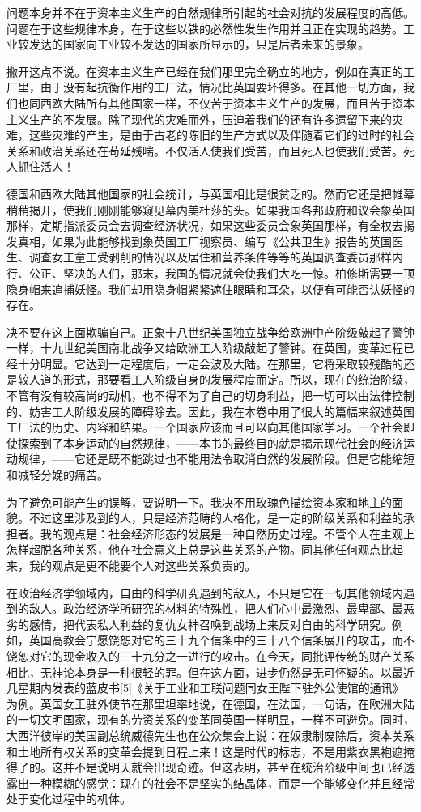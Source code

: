 \documentclass{ctexbook}
\begin{document}
问题本身并不在于资本主义生产的自然规律所引起的社会对抗的发展程度的高低。问题在于这些规律本身，在于这些以铁的必然性发生作用并且正在实现的趋势。工业较发达的国家向工业较不发达的国家所显示的，只是后者未来的景象。

撇开这点不说。在资本主义生产已经在我们那里完全确立的地方，例如在真正的工厂里，由于没有起抗衡作用的工厂法，情况比英国要坏得多。在其他一切方面，我们也同西欧大陆所有其他国家一样，不仅苦于资本主义生产的发展，而且苦于资本主义生产的不发展。除了现代的灾难而外，压迫着我们的还有许多遗留下来的灾难，这些灾难的产生，是由于古老的陈旧的生产方式以及伴随着它们的过时的社会关系和政治关系还在苟延残喘。不仅活人使我们受苦，而且死人也使我们受苦。死人抓住活人！

德国和西欧大陆其他国家的社会统计，与英国相比是很贫乏的。然而它还是把帷幕稍稍揭开，使我们刚刚能够窥见幕内美杜莎的头。如果我国各邦政府和议会象英国那样，定期指派委员会去调查经济状况，如果这些委员会象英国那样，有全权去揭发真相，如果为此能够找到象英国工厂视察员、编写《公共卫生》报告的英国医生、调查女工童工受剥削的情况以及居住和营养条件等等的英国调查委员那样内行、公正、坚决的人们，那末，我国的情况就会使我们大吃一惊。柏修斯需要一顶隐身帽来追捕妖怪。我们却用隐身帽紧紧遮住眼睛和耳朵，以便有可能否认妖怪的存在。

决不要在这上面欺骗自己。正象十八世纪美国独立战争给欧洲中产阶级敲起了警钟一样，十九世纪美国南北战争又给欧洲工人阶级敲起了警钟。在英国，变革过程已经十分明显。它达到一定程度后，一定会波及大陆。在那里，它将采取较残酷的还是较人道的形式，那要看工人阶级自身的发展程度而定。所以，现在的统治阶级，不管有没有较高尚的动机，也不得不为了自己的切身利益，把一切可以由法律控制的、妨害工人阶级发展的障碍除去。因此，我在本卷中用了很大的篇幅来叙述英国工厂法的历史、内容和结果。一个国家应该而且可以向其他国家学习。一个社会即使探索到了本身运动的自然规律，——本书的最终目的就是揭示现代社会的经济运动规律，——它还是既不能跳过也不能用法令取消自然的发展阶段。但是它能缩短和减轻分娩的痛苦。

为了避免可能产生的误解，要说明一下。我决不用玫瑰色描绘资本家和地主的面貌。不过这里涉及到的人，只是经济范畴的人格化，是一定的阶级关系和利益的承担者。我的观点是：社会经济形态的发展是一种自然历史过程。不管个人在主观上怎样超脱各种关系，他在社会意义上总是这些关系的产物。同其他任何观点比起来，我的观点是更不能要个人对这些关系负责的。

在政治经济学领域内，自由的科学研究遇到的敌人，不只是它在一切其他领域内遇到的敌人。政治经济学所研究的材料的特殊性，把人们心中最激烈、最卑鄙、最恶劣的感情，把代表私人利益的复仇女神召唤到战场上来反对自由的科学研究。例如，英国高教会宁愿饶恕对它的三十九个信条中的三十八个信条展开的攻击，而不饶恕对它的现金收入的三十九分之一进行的攻击。在今天，同批评传统的财产关系相比，无神论本身是一种很轻的罪。但在这方面，进步仍然是无可怀疑的。以最近几星期内发表的蓝皮书[5]《关于工业和工联问题同女王陛下驻外公使馆的通讯》为例。英国女王驻外使节在那里坦率地说，在德国，在法国，一句话，在欧洲大陆的一切文明国家，现有的劳资关系的变革同英国一样明显，一样不可避免。同时，大西洋彼岸的美国副总统威德先生也在公众集会上说：在奴隶制废除后，资本关系和土地所有权关系的变革会提到日程上来！这是时代的标志，不是用紫衣黑袍遮掩得了的。这并不是说明天就会出现奇迹。但这表明，甚至在统治阶级中间也已经透露出一种模糊的感觉：现在的社会不是坚实的结晶体，而是一个能够变化并且经常处于变化过程中的机体。
\end{document}
